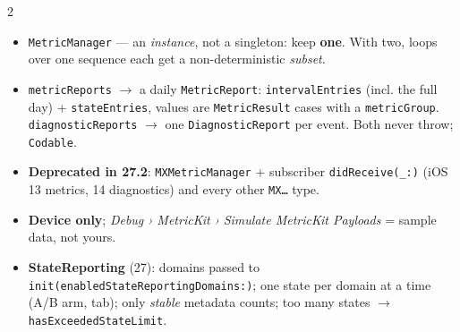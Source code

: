 \documentclass[8pt]{extarticle}
\newcommand\ct[1]{\texttt{#1}}
\newcommand\hd[1]{\par\vspace{3pt}\noindent{\bfseries\color{sheetBlue}#1}\par\vspace{1pt}}
\begin{document}

\begin{multicols}{2}
\raggedright\small{}

\hd{MetricKit — the iOS 27 API}
\begin{itemize}
  \item \ct{MetricManager} — an \emph{instance}, not a singleton: keep \textbf{one}. With two, loops
        over one sequence each get a non-deterministic \emph{subset}.
  \item \ct{metricReports} $\to$ a daily \ct{MetricReport}: \ct{intervalEntries} (incl. the full day) +
        \ct{stateEntries}, values are \ct{MetricResult} cases with a \ct{metricGroup}.
        \ct{diagnosticReports} $\to$ one \ct{DiagnosticReport} per event. Both never throw; \ct{Codable}.
  \item \textbf{Deprecated in 27.2}: \ct{MXMetricManager} + subscriber \ct{didReceive(\_:)} (iOS 13
        metrics, 14 diagnostics) and every other \ct{MX…} type.
  \item \textbf{Device only}; \emph{Debug › MetricKit › Simulate MetricKit Payloads} = sample data, not yours.
  \item \textbf{StateReporting} (27): domains passed to \ct{init(enabledStateReportingDomains:)}; one
        state per domain at a time (A/B arm, tab); only \emph{stable} metadata counts; too many states
        $\to$ \ct{hasExceededStateLimit}.
\end{itemize}


\end{multicols}
\end{document}
